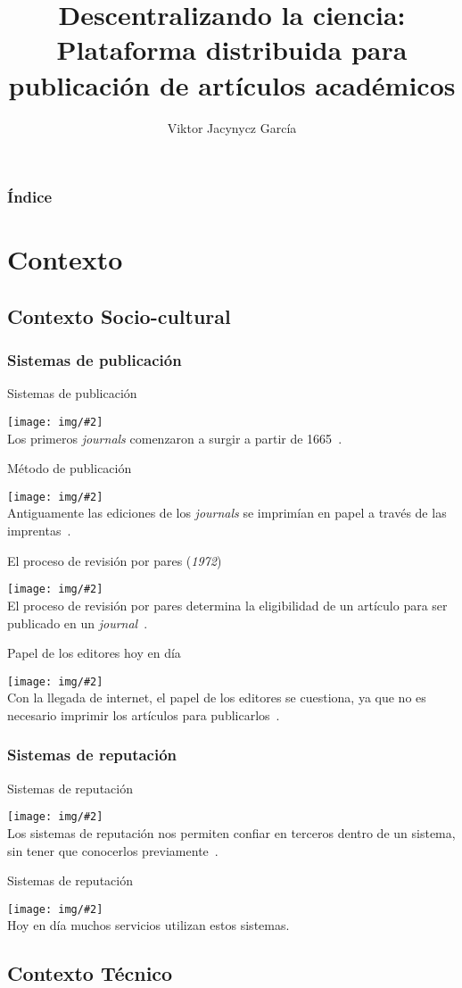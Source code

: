 \documentclass{beamer}
\title[Descentralizando la ciencia]{\huge{Descentralizando la ciencia:}\\
  Plataforma distribuida para publicación de artículos académicos}
\author[V. Jacynycz]{Viktor Jacynycz Garc\'ia}
\institute[UCM] %
{
  Grupo Grasia\\
  Facultad de informática\\
  Universidad Complutense de Madrid \\ %
  \medskip
  \textit{vsjg@ucm.es} %
}
\date{} %
\newcommand{\framei}[4]{
  \begin{frame}{#1}
    \begin{center}
      \texttt{[image: img/\#2]}\\
      #3~\cite{#4}.
    \end{center}
  \end{frame}
}
\newcommand{\framein}[3]{
  \begin{frame}{#1}
    \begin{center}
      \texttt{[image: img/\#2]}\\
      #3.
    \end{center}
  \end{frame}
}
\begin{document}
\begin{frame}
\titlepage %
\end{frame}

\begin{frame}
\frametitle{\'Indice}
\tableofcontents 
\end{frame}

\section{Contexto}
\subsection{Contexto Socio-cultural}
\subsubsection{Sistemas de publicación}
\framei{Sistemas de publicación}{journal.png}{Los primeros \emph{journals} comenzaron a
  surgir a partir de 1665}{kronick1976history}

\framei{Método de publicación}{publishing.png}{Antiguamente las ediciones de los
  \emph{journals} se imprimían en papel a través de las imprentas}{spier2002history}

\framei{El proceso de revisión por pares (\emph{1972})}{peerreview.png}{El proceso de revisión
  por pares determina la eligibilidad de un artículo para ser publicado en un \emph{journal}}{spier2002history}

\framei{Papel de los editores hoy en día}{publishers2.png}{Con la llegada de
  internet, el papel de los editores se cuestiona, ya que no es necesario
  imprimir los artículos para publicarlos}{lariviere2015oligopoly}

\subsubsection{Sistemas de reputación}
\framei{Sistemas de reputación}{reputation.png}{Los sistemas de reputación nos permiten
  confiar en terceros dentro de un sistema, sin tener que conocerlos
  previamente}{resnick2000reputation}

\framein{Sistemas de reputación}{reputation2.png}{Hoy en día muchos servicios
  utilizan estos sistemas}

\subsection{Contexto Técnico}
\end{document}
